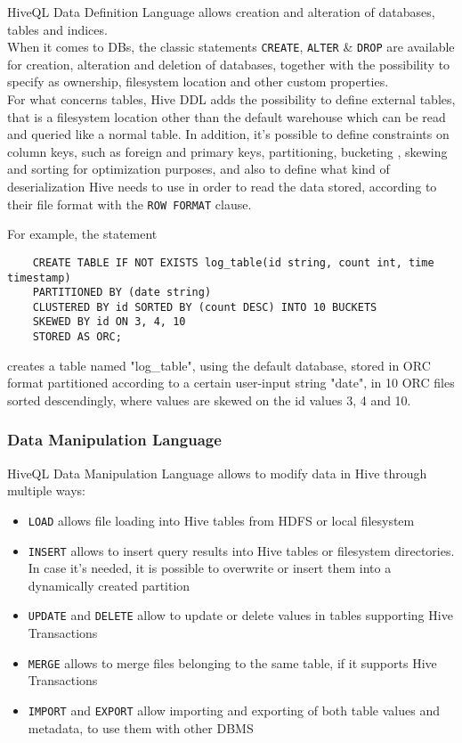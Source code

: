 HiveQL Data Definition Language allows creation and alteration of databases, tables and indices.\\When it comes to DBs, the classic statements \verb|CREATE|, \verb|ALTER| \& \verb|DROP| are available for creation, alteration and deletion of databases, together with the possibility to specify as ownership, filesystem location and other custom properties.\\
For what concerns tables, Hive DDL adds the possibility to define external tables, that is a filesystem location other than the default warehouse which can be read and queried like a normal table. In addition, it's possible to define constraints on column keys, such as foreign and primary keys, partitioning, bucketing , skewing and sorting for optimization purposes, and also to define what kind of deserialization Hive needs to use in order to read the data stored, according to their file format with the \verb|ROW FORMAT| clause.

For example, the statement

\begin{verbatim}
    CREATE TABLE IF NOT EXISTS log_table(id string, count int, time timestamp)
    PARTITIONED BY (date string)
    CLUSTERED BY id SORTED BY (count DESC) INTO 10 BUCKETS
    SKEWED BY id ON 3, 4, 10
    STORED AS ORC;
\end{verbatim}

creates a table named "log\_table", using the default database, stored in ORC format partitioned according to a certain user-input string "date", in 10 ORC files sorted descendingly, where values are skewed on the id values 3, 4 and 10.

\subsubsection{Data Manipulation Language}

HiveQL Data Manipulation Language allows to modify data in Hive through multiple ways:

\begin{itemize}
    \item \verb|LOAD| allows file loading into Hive tables from HDFS or local filesystem  
    \item \verb|INSERT| allows to insert query results into Hive tables or filesystem directories. In case it's needed, it is possible to overwrite or insert them into a dynamically created partition 
    \item \verb|UPDATE| and \verb|DELETE| allow to update or delete values in tables supporting Hive Transactions
    \item \verb|MERGE| allows to merge files belonging to the same table, if it supports Hive Transactions
    \item \verb|IMPORT| and \verb|EXPORT| allow importing and exporting of both table values and metadata, to use them with other DBMS
\end{itemize}

